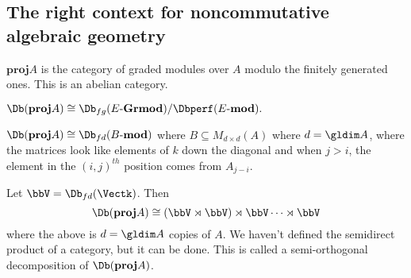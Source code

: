 \documentclass[12pt]{article}
\begin{document}
\subsection{The right context for noncommutative algebraic geometry}
\begin{defn}
	$\mathbf{proj} A$ is the category of graded modules over $A$ modulo the finitely generated ones. This is an abelian category.
\end{defn}
\begin{thm}
	$\Db(\mathbf{proj} A)\cong \Db_{fg}(E\text{-}\textbf{Grmod})/\Dbperf(E\text{-}\mathbf{mod}).$
\end{thm}

\begin{thm}[Beilinson]
	$\Db(\mathbf{proj} A)\cong\Db_{fd}(B\text{-}\mathbf{mod})$ where $B\subseteq M_{d\times d}(A)$
	where $d=\gldim A$, where the matrices look like elements of $k$ down the diagonal and when $j>i$, the element in 
	the $(i,j)^{th}$ position comes from $A_{j-i}.$
\end{thm}

\begin{thm}[Orlov]
	Let $\bbV=\Db_{fd}(\Vectk)$. Then 
	\[\Db(\mathbf{proj}A)\cong (\bbV\rtimes \bbV)\rtimes\bbV\cdots\rtimes \bbV\]
	where the above is $d=\gldim A$ copies of $A$. We haven't defined the semidirect product of a category, but it can be done. This is called a semi-orthogonal decomposition of $\Db(\mathbf{proj}A)$.
\end{thm}
\end{document}
